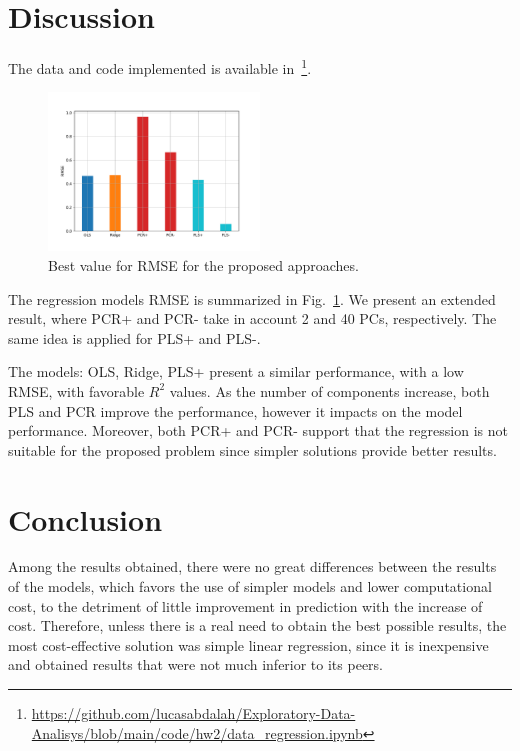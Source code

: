 \section{Discussion}

The data and code implemented is available in~\footnote{\url{https://github.com/lucasabdalah/Exploratory-Data-Analisys/blob/main/code/hw2/data_regression.ipynb}}.

\begin{figure}[htbp!]
  \centerline{\includegraphics[width=0.5\textwidth]{../../code/hw2/figures/5-summary.pdf}}
  \caption{Best value for RMSE for the proposed approaches.}
  \label{fig:5-summary}
\end{figure}

The regression models RMSE is summarized in Fig.~\ref{fig:5-summary}. We present an extended result, where PCR+ and PCR- take in account 2 and 40 PCs, respectively. The same idea is applied for PLS+ and PLS-. 

The models: OLS, Ridge, PLS+ present a similar performance, with a low RMSE, with favorable $R^2$ values. As the number of components increase, both PLS and PCR improve the performance, however it impacts on the model performance. Moreover, both PCR+ and PCR- support that the regression is not suitable for the proposed problem since simpler solutions provide better results. 

\section{Conclusion}
Among the results obtained, there were no great differences between the results of the models, which favors the use of simpler models and lower computational cost, to the detriment of little improvement in prediction with the increase of cost. Therefore, unless there is a real need to obtain the best possible results, the most cost-effective solution was simple linear regression, since it is inexpensive and obtained results that were not much inferior to its peers. 

